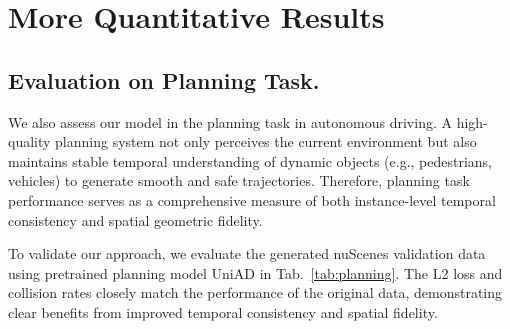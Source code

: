 \section{More Quantitative Results}



\subsection{Evaluation on Planning Task.} 
\label{app:planning}
We also assess our model in the planning task in autonomous driving.
A high-quality planning system not only perceives the current environment but also maintains stable temporal understanding of dynamic objects (e.g., pedestrians, vehicles) to generate smooth and safe trajectories. 
Therefore, planning task performance serves as a comprehensive measure of both instance-level temporal consistency and spatial geometric fidelity. 

To validate our approach, we evaluate the generated nuScenes validation data using pretrained planning model UniAD \cite{shi2016uniad} in Tab.~\ref{tab:planning}.
The L2 loss and collision rates closely match the performance of the original data, demonstrating clear benefits from improved temporal consistency and spatial fidelity.






\begin{table}[tb]
    \centering
    \footnotesize
    \caption{Comparison on planning task using the pre-trained planning model UniAD \cite{shi2016uniad}.
    We resize all generated images to 900×1600 to ensure a unified evaluation standard. The L2 loss and collision rates closely match the performance of the original data, highlighting the benefits of enhanced temporal consistency and spatial fidelity.
    }
    \label{tab:planning}
\end{table}


